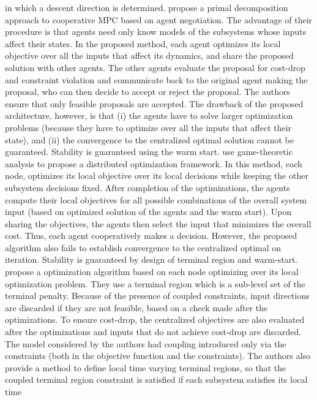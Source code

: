 in which a descent direction is
determined. \citet{maestre:pena:camacho:alamo:2011} propose a primal
decomposition approach to cooperative MPC based on agent
negotiation. The advantage of their procedure is that agents need only
know models of the subsystems whose inputs affect their states. In the
proposed method, each agent optimizes its local objective over all
the inputs that affect its dynamics, and share the proposed solution
with other agents. The other agents evaluate the proposal for
cost-drop and constraint violation and communicate back to the
original agent making the proposal, who can then decide to accept or
reject the proposal. The authors ensure that only feasible proposals
are accepted. The drawback of the proposed architecture, however, is
that (i) the agents have to solve larger optimization problems
(because they have to optimize over all the inputs that affect their
state), and (ii) the convergence to the centralized optimal solution
cannot be guaranteed. Stability is guaranteed using the warm
start. \citet{maestre:pena:camacho:2011} use game-theoretic analysis
to propose a distributed optimization framework. In this method, each
node, optimizes its local objective over its local decisions while
keeping the other subsystem decisions fixed. After completion of the
optimizations, the agents compute their local objectives for all
possible combinations of the overall system input (based on optimized
solution of the agents and the warm start). Upon sharing the
objectives, the agents then select the input that minimizes the
overall cost. Thus, each agent cooperatively makes a decision. However,
the proposed algorithm also fails to establish convergence to the
centralized optimal on iteration. Stability is guaranteed by design of
terminal region and warm-start. \citet{muller:revle:allgower:2012}
propose a optimization algorithm based on each node optimizing over
its local optimization problem. They use a terminal region which is a
sub-level set of the terminal penalty. Because of the presence of
coupled constraints, input directions are discarded if they are not
feasible, based on a check made after the optimizations. To ensure
cost-drop, the centralized objectives are also evaluated after the
optimizations and inputs that do not achieve cost-drop are
discarded. The model considered by the authors had coupling introduced
only via the constraints (both in the objective function and the
constraints). The authors also provide a method to define local time
varying terminal regions, so that the coupled terminal region
constraint is satisfied if each subsystem satisfies its local time
